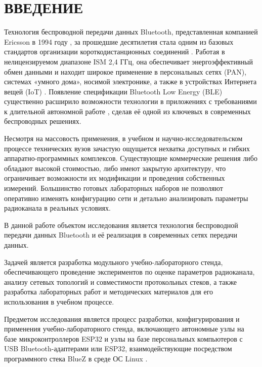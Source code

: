 \section*{ВВЕДЕНИЕ}
Технология беспроводной передачи данных Bluetooth, представленная компанией Ericsson в 1994 году \cite{bluetooth_history}, за прошедшие десятилетия стала одним из базовых стандартов организации короткодистанционных соединений \cite{bluetooth_core53, olifer_networks}. Работая в нелицензируемом диапазоне ISM 2,4 ГГц, она обеспечивает энергоэффективный обмен данными и находит широкое применение в персональных сетях (PAN), системах «умного дома», носимой электронике, а также в устройствах Интернета вещей (IoT) \cite{lagutenko_iot}. Появление спецификации Bluetooth Low Energy (BLE) \cite{ble_intro} существенно расширило возможности технологии в приложениях с требованиями к длительной автономной работе \cite{ble_performance_study, afaneh_ble_intro_2ed}, сделав её одной из ключевых в современных беспроводных решениях.

Несмотря на массовость применения, в учебном и научно-исследовательском процессе технических вузов зачастую ощущается нехватка доступных и гибких аппаратно-программных комплексов. Существующие коммерческие решения либо обладают высокой стоимостью, либо имеют закрытую архитектуру, что ограничивает возможности их модификации и проведения собственных измерений. Большинство готовых лабораторных наборов не позволяют оперативно изменять конфигурацию сети и детально анализировать параметры радиоканала в реальных условиях.

В данной работе объектом исследования является технология беспроводной передачи данных Bluetooth и её реализация в современных сетях передачи данных.

Задачей является разработка модульного учебно-лабораторного стенда, обеспечивающего проведение экспериментов по оценке параметров радиоканала, анализу сетевых топологий и совместимости протокольных стеков, а также разработка лабораторных работ и методических материалов для его использования в учебном процессе.

Предметом исследования является процесс разработки, конфигурирования и применения учебно-лабораторного стенда, включающего автономные узлы на базе микроконтроллеров ESP32 \cite{esp32_bt, esp_idf_bt_docs, adventure_esp32} и узлы на базе персональных компьютеров с USB Bluetooth-адаптерами или ESP32, взаимодействующие посредством программного стека BlueZ в среде ОС Linux \cite{bluez_stack, korbet_linux_net}.


